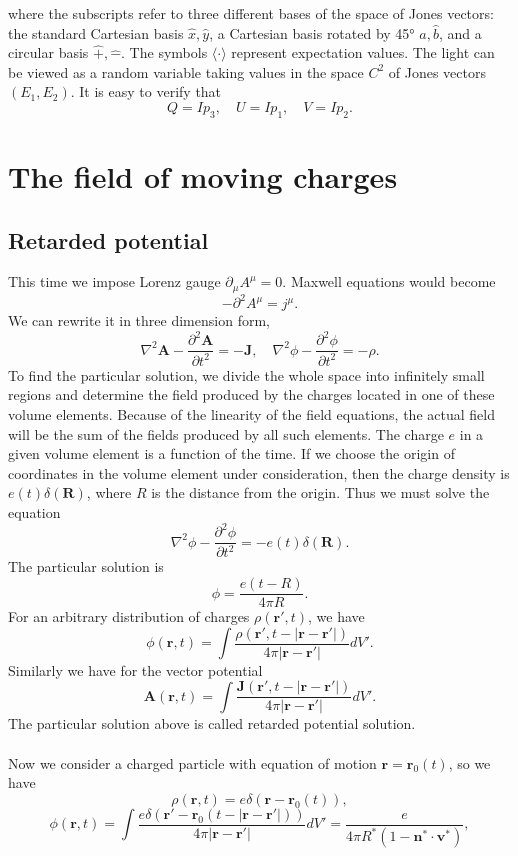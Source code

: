 where the subscripts refer to three different bases of the space of Jones vectors: the standard Cartesian basis ${\hat {x}},{\hat {y}}$, a Cartesian basis rotated by 45° ${\hat {a}},{\hat {b}}$, and a circular basis ${\hat {+}},{\hat {-}}$. 
The symbols $\langle \cdot \rangle$ represent expectation values. The light can be viewed as a random variable taking values in the space $C^2$ of Jones vectors $(E_1,E_2)$. It is easy to verify that
\[Q = Ip_3 , \quad U = Ip_1 , \quad V = Ip_2.\]

\section{The field of moving charges}
\subsection{Retarded potential}
This time we impose Lorenz gauge $\partial_{\mu} A^{\mu} = 0$. Maxwell equations would become
\[-\partial^2 A^{\mu} = j^{\mu}.\]
We can rewrite it in three dimension form,
\[\nabla^2 \bm{A} - \frac{\partial^2 \bm{A}}{\partial t^2} = -\bm{J} , \quad \nabla^2 \phi - \frac{\partial^2\phi}{\partial t^2} = -\rho.\]
To find the particular solution, we divide the whole space into infinitely small regions and determine the field produced by the charges located in one of these volume elements. Because of the linearity of the field equations, the actual field will be the sum of the fields produced by all such elements.
The charge $e$ in a given volume element is a function of the time. If we choose the origin of coordinates in the volume element under consideration, then the charge density is $e(t)\delta(\bm{R})$, where $R$ is the distance from the origin. Thus we must solve the equation
\[\nabla^2 \phi - \frac{\partial^2\phi}{\partial t^2} = -e(t)\delta(\bm{R}).\]
The particular solution is
\[\phi = \frac{e(t-R)}{4\pi R}.\]
For an arbitrary distribution of charges $\rho(\bm{r}',t)$, we have
\[\phi(\bm{r},t) = \int \frac{\rho(\bm{r}',t-|\bm{r}-\bm{r}'|)}{4\pi |\bm{r}-\bm{r}'|} dV'.\]
Similarly we have for the vector potential
\[\bm{A}(\bm{r},t) = \int \frac{\bm{J}(\bm{r}',t-|\bm{r}-\bm{r}'|)}{4\pi |\bm{r}-\bm{r}'|} dV'.\]
The particular solution above is called retarded potential solution.
\\ \\
Now we consider a charged particle with equation of motion $\bm{r} = \bm{r}_0(t)$, so we have
\[\rho(\bm{r},t) = e\delta(\bm{r}-\bm{r}_0(t)),\]
\[\phi(\bm{r},t) = \int \frac{e \delta (\bm{r}'-\bm{r}_0(t-|\bm{r}-\bm{r}'|))}{4\pi |\bm{r}-\bm{r}'|} dV' = \frac{e}{4\pi R^* (1 - \bm{n}^{*}\cdot\bm{v}^{*})},\]
